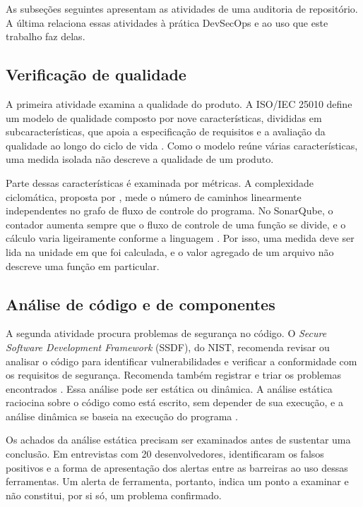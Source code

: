 As subseções seguintes apresentam as atividades de uma auditoria de repositório. A última relaciona essas atividades à prática DevSecOps e ao uso que este trabalho faz delas.

\subsection{Verificação de qualidade}
\label{rt-2-1-1}

A primeira atividade examina a qualidade do produto. A ISO/IEC 25010 define um modelo de qualidade composto por nove características, divididas em subcaracterísticas, que apoia a especificação de requisitos e a avaliação da qualidade ao longo do ciclo de vida \cite{iso25010}. Como o modelo reúne várias características, uma medida isolada não descreve a qualidade de um produto.

Parte dessas características é examinada por métricas. A complexidade ciclomática, proposta por , mede o número de caminhos linearmente independentes no grafo de fluxo de controle do programa. No SonarQube, o contador aumenta sempre que o fluxo de controle de uma função se divide, e o cálculo varia ligeiramente conforme a linguagem \cite{sonarMetrics99}. Por isso, uma medida deve ser lida na unidade em que foi calculada, e o valor agregado de um arquivo não descreve uma função em particular.

\subsection{Análise de código e de componentes}
\label{rt-2-1-2}

A segunda atividade procura problemas de segurança no código. O \textit{Secure Software Development Framework} (SSDF), do NIST, recomenda revisar ou analisar o código para identificar vulnerabilidades e verificar a conformidade com os requisitos de segurança. Recomenda também registrar e triar os problemas encontrados \cite{nistSsdf}. Essa análise pode ser estática ou dinâmica. A análise estática raciocina sobre o código como está escrito, sem depender de sua execução, e a análise dinâmica se baseia na execução do programa \cite{blackIr8397}.

Os achados da análise estática precisam ser examinados antes de sustentar uma conclusão. Em entrevistas com 20 desenvolvedores,  identificaram os falsos positivos e a forma de apresentação dos alertas entre as barreiras ao uso dessas ferramentas. Um alerta de ferramenta, portanto, indica um ponto a examinar e não constitui, por si só, um problema confirmado.

